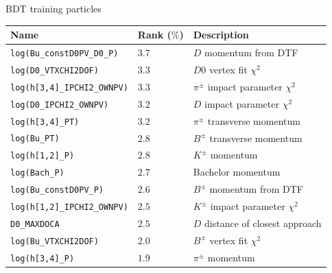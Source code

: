 \documentclass{beamer}
\begin{document}
\begin{frame}{BDT training particles}
  \centering
  \begin{tabular}{|l|l|l|}
    \hline
    Name & Rank ($\%$) & Description \\
    \hline
    \texttt{log(Bu\_constD0PV\_D0\_P)} & $3.7$ & $D$ momentum from DTF \\
    \texttt{log(D0\_VTXCHI2DOF)} & $3.3$ & $D0$ vertex fit $\chi^2$ \\
    \texttt{log(h[3,4]\_IPCHI2\_OWNPV)} & $3.3$ & $\pi^\pm$ impact parameter $\chi^2$ \\
    \texttt{log(D0\_IPCHI2\_OWNPV)} & $3.2$ & $D$ impact parameter $\chi^2$ \\
    \texttt{log(h[3,4]\_PT)} & $3.2$ & $\pi^\pm$ transverse momentum \\
    \texttt{log(Bu\_PT)} & $2.8$ & $B^\pm$ transverse momentum \\
    \texttt{log(h[1,2]\_P)} & $2.8$ & $K^\pm$ momentum \\
    \texttt{log(Bach\_P)} & $2.7$ & Bachelor momentum \\
    \texttt{log(Bu\_constD0PV\_P)} & $2.6$ & $B^\pm$ momentum from DTF \\
    \texttt{log(h[1,2]\_IPCHI2\_OWNPV)} & $2.5$ & $K^\pm$ impact parameter $\chi^2$ \\
    \texttt{D0\_MAXDOCA} & $2.5$ & $D$ distance of closest approach \\
    \texttt{log(Bu\_VTXCHI2DOF)} & $2.0$ & $B^\pm$ vertex fit $\chi^2$ \\
    \texttt{log(h[3,4]\_P)} & $1.9$ & $\pi^\pm$ momentum \\
    \hline
  \end{tabular}
\end{frame}
\end{document}
